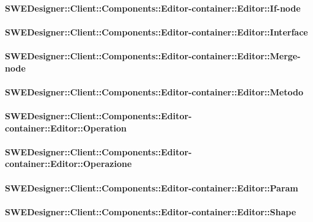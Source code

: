 			\paragraph{SWEDesigner::Client::Components::Editor-container::Editor::If-node}
				
				
			\paragraph{SWEDesigner::Client::Components::Editor-container::Editor::Interface}
				
				
			\paragraph{SWEDesigner::Client::Components::Editor-container::Editor::Merge-node}
				
				
			\paragraph{SWEDesigner::Client::Components::Editor-container::Editor::Metodo}
				
				
			\paragraph{SWEDesigner::Client::Components::Editor-container::Editor::Operation}
				
				
			\paragraph{SWEDesigner::Client::Components::Editor-container::Editor::Operazione}
				
				
			\paragraph{SWEDesigner::Client::Components::Editor-container::Editor::Param}
				
				
			\paragraph{SWEDesigner::Client::Components::Editor-container::Editor::Shape}
				
				
